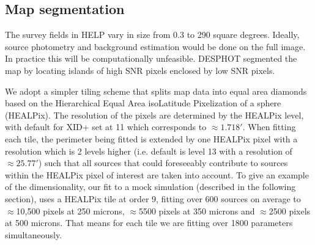 \documentclass[useAMS,usenatbib]{mnras}
\begin{document}
\subsection{Map segmentation}
The survey fields in HELP vary in size from 0.3 to 290 square degrees. Ideally, source photometry and background estimation would be done on the full image. In practice this will be computationally unfeasible. \textsc{DESPHOT} segmented the map by locating islands of high SNR pixels enclosed by low SNR pixels.

%
%
We adopt a simpler tiling scheme that splits map data into equal area diamonds based on the Hierarchical Equal Area isoLatitude Pixelization of a sphere (HEALPix). The resolution of the pixels are determined by the HEALPix level, with default for \textsc{XID+} set at 11 which corresponds to $\approx 1.718'$. When fitting each tile, the perimeter being fitted is extended by one HEALPix pixel with a resolution which is 2 levels higher (i.e. default is level 13 with a resolution of $\approx 25.77'$) such that all sources that could foreseeably contribute to sources within the HEALPix pixel of interest are taken into account. To give an example of the dimensionality, our fit to a mock simulation (described in the following section),  uses a HEALPix tile at order 9, fitting over 600 sources on average to  $\approx$10,500 pixels at 250 microns, $\approx$5500 pixels at 350 microns and $\approx$2500 pixels at 500 microns. That means for each tile we are fitting over 1800 parameters simultaneously.
\end{document}
